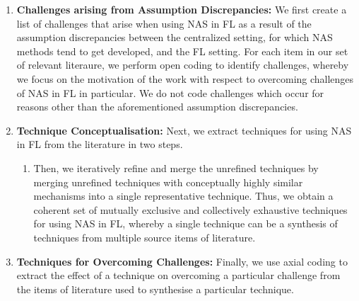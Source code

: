 \begin{enumerate}
    \item \textbf{Challenges arising from Assumption Discrepancies:} We first create a list of challenges that arise when using NAS in FL as a result of the assumption discrepancies between the centralized setting, for which NAS methods tend to get developed, and the FL setting. For each item in our set of relevant literaure, we perform open coding to identify challenges, whereby we focus on the motivation of the work with respect to overcoming challenges of NAS in FL in particular. We do not code challenges which occur for reasons other than the aforementioned assumption discrepancies.

    \item \textbf{Technique Conceptualisation:} Next, we extract techniques for using NAS in FL from the literature in two steps.
    \begin{enumerate}
        \item Then, we iteratively refine and merge the unrefined techniques by merging unrefined techniques with conceptually highly similar mechanisms into a single representative technique. Thus, we obtain a coherent set of mutually exclusive and collectively exhaustive techniques for using NAS in FL, whereby a single technique can be a synthesis of techniques from multiple source items of literature.
    \end{enumerate}

    \item \textbf{Techniques for Overcoming Challenges:} Finally, we use axial coding to extract the effect of a technique on overcoming a particular challenge from the items of literature used to synthesise a particular technique.
\end{enumerate}